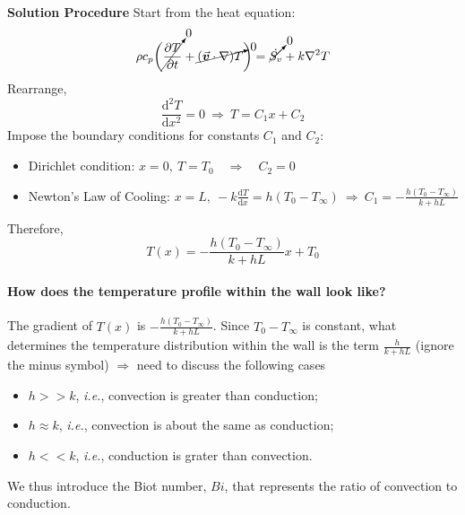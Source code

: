 \documentclass[12pt, a4paper]{article}
\numberwithin{equation}{subsection}
\begin{document}
\begin{tcolorbox}[breakable, title = \textbf{Example: Wall Exposed to Convection}]
\textbf{Solution Procedure} \quad
Start from the heat equation:
\[ 
    \rho c_{p}\bigg(\cancelto{0}{\frac{\partial T}{\partial t}} +\cancelto{0}{(\vec{\bm{v}} \cdot \nabla) T}\bigg) = \cancelto{0}{\dot{S_{v}}}  +k \nabla^{2} T 
\]
Rearrange,
\[ 
    \frac{\mathrm{d}^{2} T}{\mathrm{d} x^{2}} = 0 \ \Rightarrow \ T = C_{1}x + C_{2} 
\]
Impose the boundary conditions for constants $C_1$ and $C_2$:
\begin{itemize}
    \item Dirichlet condition: $\displaystyle x=0, \ T = T_{0} \quad \Rightarrow \quad C_{2}=0$
    \item Newton's Law of Cooling: $\displaystyle x=L, \ -k\frac{\mathrm{d}T}{\mathrm{d}x}=h(T_{0}-T_{\infty}) \ \Rightarrow \ C_{1}=-\frac{h(T_{0}-T_{\infty})}{k+hL}$
\end{itemize}
Therefore,
\[ 
    T(x) = -\frac{h(T_{0}-T_{\infty})}{k+hL}x + T_0
\]
\paragraph{How does the temperature profile within the wall look like?} The gradient of $T(x)$ is $\displaystyle -\frac{h(T_{0}-T_{\infty})}{k+hL}$. Since $T_0 - T_\infty$ is constant, what determines the temperature distribution within the wall is the term $\displaystyle \frac{h}{k+hL}$ (ignore the minus symbol) $\Rightarrow$ need to discuss the following cases
\begin{itemize}
    \item $h>>k$, \textit{i.e.}, convection is greater than conduction;
    \item $h \approx k$, \textit{i.e.}, convection is about the same as conduction;
    \item $h<<k$, \textit{i.e.}, conduction is grater than convection.
\end{itemize}
We thus introduce the Biot number, $Bi$, that represents the ratio of convection to conduction.
\end{tcolorbox}
\end{document}

